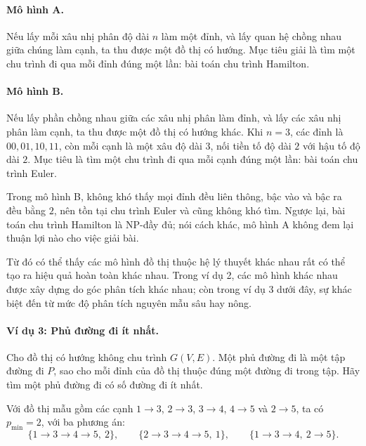 \documentclass[11pt]{article}
\begin{document}
\paragraph{Mô hình A.}
Nếu lấy mỗi xâu nhị phân độ dài \(n\) làm một đỉnh, và lấy quan hệ chồng nhau
giữa chúng làm cạnh, ta thu được một đồ thị có hướng. Mục tiêu giải là tìm
một chu trình đi qua mỗi đỉnh đúng một lần: bài toán chu trình Hamilton.

\paragraph{Mô hình B.}
Nếu lấy phần chồng nhau giữa các xâu nhị phân làm đỉnh, và lấy các xâu nhị
phân làm cạnh, ta thu được một đồ thị có hướng khác. Khi \(n=3\), các đỉnh là
\(00,01,10,11\), còn mỗi cạnh là một xâu độ dài \(3\), nối tiền tố độ dài
\(2\) với hậu tố độ dài \(2\). Mục tiêu là tìm một chu trình đi qua mỗi cạnh
đúng một lần: bài toán chu trình Euler.

Trong mô hình B, không khó thấy mọi đỉnh đều liên thông, bậc vào và bậc ra
đều bằng \(2\), nên tồn tại chu trình Euler và cũng không khó tìm. Ngược lại,
bài toán chu trình Hamilton là NP-đầy đủ; nói cách khác, mô hình A không đem
lại thuận lợi nào cho việc giải bài.

Từ đó có thể thấy các mô hình đồ thị thuộc hệ lý thuyết khác nhau rất có thể
tạo ra hiệu quả hoàn toàn khác nhau. Trong ví dụ 2, các mô hình khác nhau
được xây dựng do góc phân tích khác nhau; còn trong ví dụ 3 dưới đây, sự khác
biệt đến từ mức độ phân tích nguyên mẫu sâu hay nông.

\paragraph{Ví dụ 3: Phủ đường đi ít nhất.}
Cho đồ thị có hướng không chu trình \(G(V,E)\). Một phủ đường đi là một tập
đường đi \(P\), sao cho mỗi đỉnh của đồ thị thuộc đúng một đường đi trong
tập. Hãy tìm một phủ đường đi có số đường đi ít nhất.

Với đồ thị mẫu gồm các cạnh \(1\to3\), \(2\to3\), \(3\to4\), \(4\to5\) và
\(2\to5\), ta có \(p_{\min}=2\), với ba phương án:
\[
\{1\to3\to4\to5,\ 2\},\qquad
\{2\to3\to4\to5,\ 1\},\qquad
\{1\to3\to4,\ 2\to5\}.
\]
\end{document}
